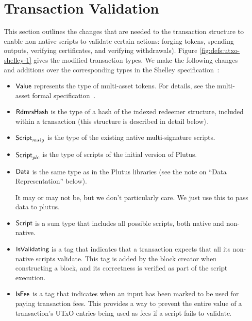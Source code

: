 \section{Transaction Validation}
\label{sec:transactions}

This section outlines the changes that are needed to the transaction
structure to enable non-native scripts to validate
certain actions: forging tokens, spending outputs, verifying certificates, and
verifying withdrawals).
%
Figure \ref{fig:defs:utxo-shelley-1} gives the modified transaction types.
We make the following changes and additions over the corresponding types in the
Shelley specification~\cite{XX}:

\begin{itemize}
  \item $\mathsf{Value}$ represents the type of multi-asset tokens. For details,
  see the multi-asset formal specification~\cite{XX}.

  \item $\mathsf{RdmrsHash}$ is the type of a hash of the indexed redeemer structure,
  included within a transaction (this structure is described in detail below).

  \item $\mathsf{Script}_{msig}$ is the type of the existing native multi-signature scripts.

  \item $\mathsf{Script}_{plc}$ is the type of scripts of the initial version of Plutus.

  \item $\mathsf{Data}$ is the same type as in the Plutus libraries (see the note on ``Data Representation'' below).
    \begin{note}
      It may or may not be, but we don't particularly care. We just use this to pass data to plutus.
    \end{note}

  \item $\mathsf{Script}$ is a sum type that includes all possible scripts, both native and non-native.

  \item $\mathsf{IsValidating}$ is a tag that indicates that a transaction
  expects that all its non-native scripts validate.
  This tag is added by the block creator when
  constructing a block, and its correctness is verified as part of the script execution.

  \item $\mathsf{IsFee}$ is a tag that indicates when an input has been marked
    to be used for paying transaction fees.
    This provides a way to prevent
  the entire value of a transaction's UTxO entries being used as fees if a script fails to validate.


\end{itemize}
